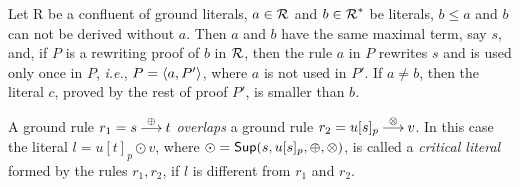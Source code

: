 \begin{lemma} \label {le:first-rule}
Let \C R be a confluent of ground literals, \(a\in \mbox {$\cal R$}\)
and \(b\in\mbox {$\cal R$}^\ast\) be literals, \(b\leq a\) and $b$ can not be derived
without $a$. Then $a$ and $b$ have the same maximal term, say $s$, and, if $P$
is a rewriting proof of $b$ in $\mbox {$\cal R$}$, then the rule $a$
in $P$ rewrites $s$ and is used only once in $P$,
{\em i.e.}, \(P=\langle a,P'\rangle\), where $a$ is not used in $P'$. If \(a\ne b\), then the
literal \(c\), proved by the rest of proof $P'$, is smaller than $b$.
\end{lemma}
%
%
%
%
%
\begin{definition} \label{def:critical-literal}
A ground rule \(r_1 = s\mathbin {\stackrel {\oplus}{\longrightarrow}} t\) {\em overlaps} a ground rule \(r_2 =
u[s]_p \mathbin {\stackrel {\otimes}{\longrightarrow}} v\). In this case the literal \(l = u[t]_p \odot v\),
where \(\odot = \mbox {\sf Sup}(s,u[s]_p,\oplus,\otimes)\), is called a {\em critical
literal} formed by the rules \(r_1,r_2\), if $l$ is different from \(r_1\)
and \(r_2\).
\end{definition}

